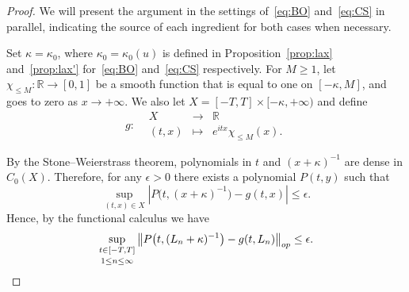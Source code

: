 \documentclass[10pt,a4paper]{amsart}
\newcommand{\op}{\textup{op}}
\begin{document}
\begin{proof}
We will present the argument in the settings of~\eqref{eq:BO} and~\eqref{eq:CS} in parallel, indicating the source of each ingredient for both cases when necessary.

Set $\kappa = \kappa_0$, where $\kappa_0 = \kappa_0(u)$ is defined in Proposition~\ref{prop:lax} and~\ref{prop:lax'} for~\eqref{eq:BO} and~\eqref{eq:CS} respectively.
For $M \ge 1$, let $\chi_{\leq M}: \mathbb{R} \to  [0,1]$ be a smooth function that is equal to one on $[-\kappa, M]$, and goes to zero as $x\to +\infty$. We also let $X = [-T,T] \times [ -\kappa, +\infty)$ and define
%
\[ g \colon
\begin{array}{rccl}
 &X & \longrightarrow & \mathbb{R} \\
&(t, x) & \longmapsto & e^{itx} \chi_{\leq M}(x).
\end{array}\]
%

By the Stone--Weierstrass theorem, polynomials in $t$ and $(x+\kappa)^{-1}$ are dense in $C_{0}(X)$.  Therefore, for any $\epsilon>0$ there exists a polynomial $P(t,y)$ 
such that
\[
\sup_{(t,x)\in X} \left|P\big(t,(x+\kappa)^{-1}\big) - g(t,x)\right| \le \epsilon.
\] 
Hence, by the functional calculus we have
\begin{equation}\label{eq:secondT}
\sup_{\substack{t \in [-T,T] \\[.2em] 1\le n \le \infty }} \left\| P\big(t, (L_n + \kappa)^{-1}\big) - g(t, L_n)\right\|_{\op} \le \epsilon.
\end{equation}
%


\end{proof}
\end{document}
